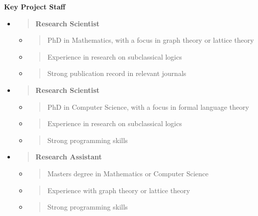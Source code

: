 \textbf{Key Project Staff}

\begin{itemize}
\item
  \begin{quote}
  \textbf{Research Scientist\\
  }
  \end{quote}

  \begin{itemize}
  \item
    \begin{quote}
    PhD in Mathematics, with a focus in graph theory or lattice theory
    \end{quote}
  \item
    \begin{quote}
    Experience in research on subclassical logics
    \end{quote}
  \item
    \begin{quote}
    Strong publication record in relevant journals
    \end{quote}
  \end{itemize}
\item
  \begin{quote}
  \textbf{Research Scientist\\
  }
  \end{quote}

  \begin{itemize}
  \item
    \begin{quote}
    PhD in Computer Science, with a focus in formal language theory
    \end{quote}
  \item
    \begin{quote}
    Experience in research on subclassical logics
    \end{quote}
  \item
    \begin{quote}
    Strong programming skills
    \end{quote}
  \end{itemize}
\item
  \begin{quote}
  \textbf{Research Assistant\\
  }
  \end{quote}

  \begin{itemize}
  \item
    \begin{quote}
    Master\textquotesingle s degree in Mathematics or Computer Science
    \end{quote}
  \item
    \begin{quote}
    Experience with graph theory or lattice theory
    \end{quote}
  \item
    \begin{quote}
    Strong programming skills
    \end{quote}
  \end{itemize}
\end{itemize}

